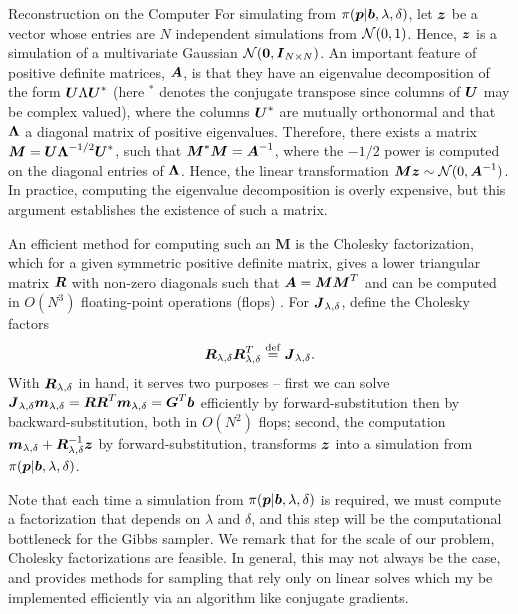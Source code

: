 \begin{chapter}{Reconstruction on the Computer}
For simulating from $\pi(\mbox{\boldmath$p$}|\mbox{\boldmath$b$}, \lambda,\delta)$, let $\mbox{\boldmath$z$}$ be a vector whose entries are $N$ independent simulations from $\mathcal{N}(0,1)$. 
Hence, $\mbox{\boldmath$z$}$ is a simulation of a multivariate Gaussian $\mathcal{N}(\mbox{\boldmath$0$},\mbox{\boldmath$I$}_{N\times N})$.
An important feature of positive definite matrices, $\mbox{\boldmath$A$}$, is that they have an eigenvalue decomposition of the form $\mbox{\boldmath$U$} \Lambda \mbox{\boldmath$U$}^*$ (here $^*$ denotes the conjugate transpose since columns of $\mbox{\boldmath$U$}$ may be complex valued), where the columns $\mbox{\boldmath$U$}^*$ are mutually orthonormal and that $\mbox{\boldmath$\Lambda$}$ a diagonal matrix of positive eigenvalues.
Therefore, there exists a matrix $\mbox{\boldmath$M$} = \mbox{\boldmath$U$} \mbox{\boldmath$\Lambda$}^{-1/2} \mbox{\boldmath$U$}^*$, such that $\mbox{\boldmath$M$}^*\mbox{\boldmath$M$} = \mbox{\boldmath$A$}^{-1}$, where the $-1/2$ power is computed on the diagonal entries of $\mbox{\boldmath$\Lambda$}$.
Hence, the linear transformation $\mbox{\boldmath$M$} \mbox{\boldmath$z$} \sim \mathcal{N}(0,\mbox{\boldmath$A$}^{-1})$.  
In practice, computing the eigenvalue decomposition is overly expensive, but this argument establishes the existence of such a matrix.

An efficient method for computing such an $\bm M$ is the Cholesky factorization, which for a given symmetric positive definite matrix, gives a lower triangular matrix $\mbox{\boldmath$R$}$ with non-zero diagonals such that $\mbox{\boldmath$A$} = \mbox{\boldmath$M$}\mbox{\boldmath$M$}^T$ and can be computed in $O(N^3)$ floating-point operations (flops) \citep{golub2012matrix}.
For $\mbox{\boldmath$J$}_{\lambda,\delta}$, define the Cholesky factors
\begin{equation} \label{eq:choleskyJ}
  \mbox{\boldmath$R$}_{\lambda,\delta}\mbox{\boldmath$R$}_{\lambda,\delta}^T \stackrel{\rm def}{=} \mbox{\boldmath$J$}_{\lambda,\delta}.
\end{equation}
With $\mbox{\boldmath$R$}_{\lambda,\delta}$ in hand, it serves two purposes -- first we can solve $\mbox{\boldmath$J$}_{\lambda,\delta} \mbox{\boldmath$m$}_{\lambda,\delta} = \mbox{\boldmath$R$}\mbox{\boldmath$R$}^T \mbox{\boldmath$m$}_{\lambda,\delta} = \mbox{\boldmath$G$}^T \mbox{\boldmath$b$}$ efficiently by forward-substitution then by backward-substitution, both in $O(N^2)$ flops; second, the computation $\mbox{\boldmath$m$}_{\lambda,\delta} + \mbox{\boldmath$R$}_{\lambda,\delta}^{-1} \mbox{\boldmath$z$}$ by forward-substitution, transforms $\mbox{\boldmath$z$}$ into a simulation from $\pi(\mbox{\boldmath$p$} | \mbox{\boldmath$b$},\lambda,\delta)$.

Note that each time a simulation from $\pi(\mbox{\boldmath$p$}|\mbox{\boldmath$b$},\lambda,\delta)$ is required, we must compute a factorization that depends on $\lambda$ and $\delta$, and this step will be the computational bottleneck for the Gibbs sampler.
We remark that for the scale of our problem, Cholesky factorizations are feasible.
In general, this may not always be the case, and \citep{bardsley2012mcmc} provides methods for sampling that rely only on linear solves which my be implemented efficiently via an algorithm like conjugate gradients.


\end{chapter}
